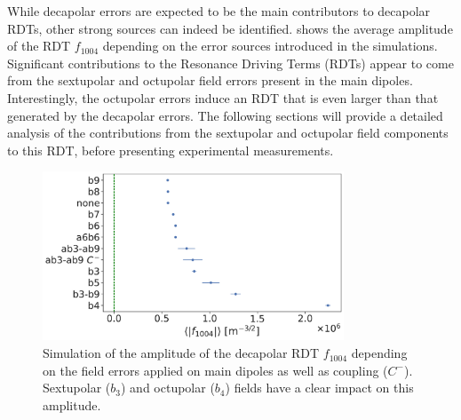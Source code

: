 While decapolar errors are expected to be the main contributors to decapolar RDTs, other strong
sources can indeed be identified.  shows the average
amplitude of the RDT $f_{1004}$ depending on the error sources introduced in the simulations. 
Significant contributions to the Resonance Driving Terms (RDTs) appear to come from the sextupolar
and octupolar field errors present in the main dipoles. Interestingly, the octupolar errors induce
an RDT that is even larger than that generated by the decapolar errors. 
The following sections will provide a detailed analysis of the contributions from the sextupolar and
octupolar field components to this RDT, before presenting experimental measurements.

\begin{figure}[!htb]
    \centering
    \includegraphics[width=0.8\textwidth]{./images/f1004/f1004_several_factors.pdf}
    \caption{Simulation of the amplitude of the decapolar RDT $f_{1004}$ depending on the field
             errors applied on main dipoles as well as coupling ($C^-$). Sextupolar ($b_3$) and
             octupolar ($b_4$) fields have a clear impact on this amplitude.}
    \label{fig:decapoles:rdts:contributions}
\end{figure}


%
%


